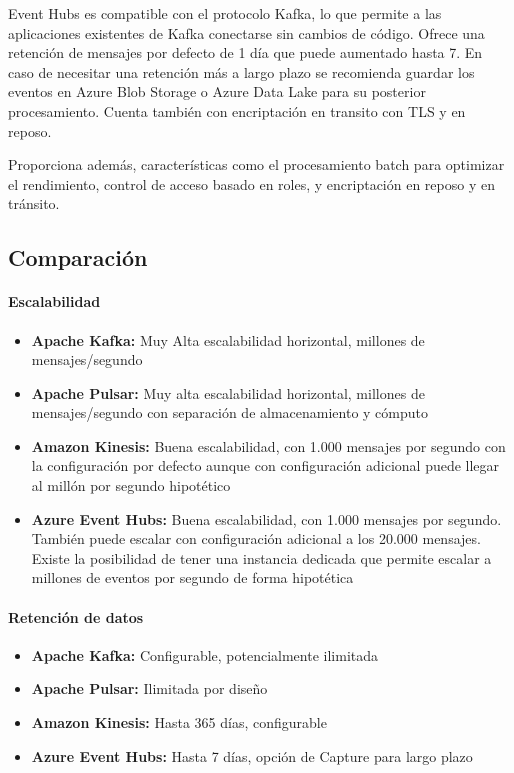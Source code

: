 Event Hubs es compatible con el protocolo Kafka, lo que permite a las aplicaciones existentes de Kafka conectarse sin cambios de código.
Ofrece una retención de mensajes por defecto de 1 día que puede aumentado hasta 7. En caso de necesitar una retención más a largo plazo
se recomienda guardar los eventos en Azure Blob Storage o Azure Data Lake para su posterior procesamiento. 
Cuenta también con encriptación en transito con TLS y en reposo.\newline

Proporciona además, características como el procesamiento batch para optimizar el rendimiento, 
control de acceso basado en roles, y encriptación en reposo y en tránsito. 

\subsection{Comparación}

\paragraph{Escalabilidad}
\begin{itemize}
    \item \textbf{Apache Kafka:} Muy Alta escalabilidad horizontal, millones de mensajes/segundo
    \item \textbf{Apache Pulsar:} Muy alta escalabilidad horizontal, millones de mensajes/segundo con separación de almacenamiento y cómputo
    \item \textbf{Amazon Kinesis:} Buena escalabilidad, con 1.000 mensajes por segundo con la configuración por defecto aunque con configuración adicional puede llegar al millón por segundo hipotético
    \item \textbf{Azure Event Hubs:} Buena escalabilidad, con 1.000 mensajes por segundo. También puede escalar con configuración adicional a los 20.000 mensajes. Existe la posibilidad de tener una instancia dedicada que permite escalar a millones de eventos por segundo de forma hipotética
\end{itemize}

\newpage
\paragraph{Retención de datos}
\begin{itemize}
    \item \textbf{Apache Kafka:} Configurable, potencialmente ilimitada
    \item \textbf{Apache Pulsar:} Ilimitada por diseño
    \item \textbf{Amazon Kinesis:} Hasta 365 días, configurable
    \item \textbf{Azure Event Hubs:} Hasta 7 días, opción de Capture para largo plazo
\end{itemize}

